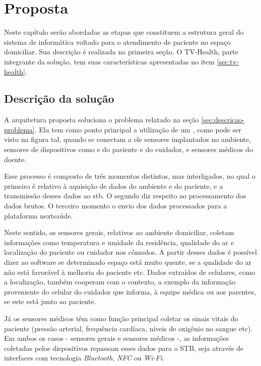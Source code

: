 \chapter{Proposta}\label{cap:proposta}

Neste capítulo serão abordadas as etapas que constituem a estrutura geral do
sistema de informática voltado para o atendimento de paciente no espaço domiciliar. 
Sua descrição é realizada na primeira seção. O TV-Health, parte integrante da 
solução, tem suas características apresentadas no item \ref{sec:tv-health}.

\section{Descrição da solução}
\label{sec:descricao-solucao}

A arquitetura proposta soluciona o problema relatado na seção  
\ref{sec:descricao-problema}. Ela tem como ponto principal a utilização de 
um \stb[], como pode ser visto na figura tal, quando se conectam a ele sensores 
implantados no ambiente, sensores de dispositivos como \smartphones[] e 
\smartwatches[] do paciente e do cuidador, e sensores médicos do doente.

Esse processo é composto de três momentos distintos, mas 
interligados, no qual o primeiro é relativo à aquisição de dados do ambiente
e do paciente, e a transmissão desses dados ao stb. O segundo diz respeito
ao processamento dos dados brutos. O terceiro momento o envio dos dados
processados para a plataforma nextsaúde.

Neste sentido, os sensores gerais, relativos ao ambiente domiciliar, coletam informações como 
temperatura e umidade da residência, qualidade do ar e localização do paciente
ou cuidador nos cômodos. A partir desses dados é possível dizer ao software se
determinado espaço está muito quente, se a qualidade do ar não está favorável
à melhoria do paciente etc. Dados extraídos de celulares, como a localização,
também cooperam com o contexto, a exemplo da informação proveniente
do celular do cuidador que informa, à equipe médica ou aos parentes,
se este está junto ao paciente.  

Já os sensores médicos têm como função principal coletar os sinais vitais do
paciente (pressão arterial, frequência cardíaca, níveis de oxigênio no sangue
etc). Em ambos os casos - sensores gerais e sensores médicos -, as informações
coletadas pelos dispositivos repassam  esses dados para o STB, seja através de
interfaces com tecnologia  \textit{Bluetooth}, \textit{NFC} ou \textit{Wi-Fi}.

